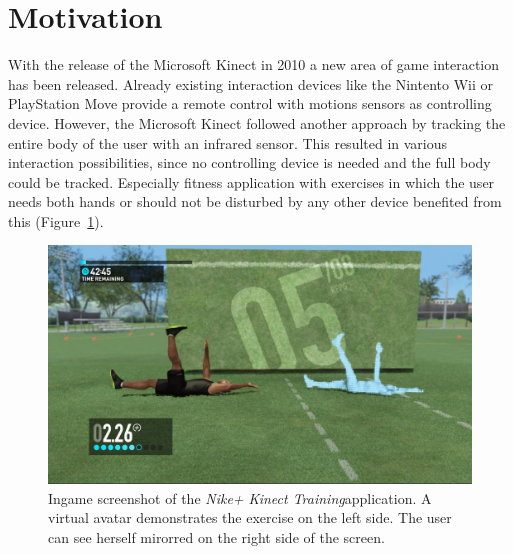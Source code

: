 \section{Motivation}
With the release of the Microsoft Kinect in 2010 a new area of game interaction has been released.
Already existing interaction devices like the Nintento Wii or PlayStation Move provide a remote control with motions sensors as controlling device.
However, the Microsoft Kinect followed another approach by tracking the entire body of the user with an infrared sensor.
This resulted in various interaction possibilities, since no controlling device is needed and the full body could be tracked.
Especially fitness application with exercises in which the user needs both hands or should not be disturbed by any other device benefited from this (Figure~\ref{fig:1_kinectSports}).
\begin{figure}[htb]
	\centering
	\begin{minipage}[t]{1\linewidth}
		\centering
		\includegraphics[width=0.55\linewidth]{Pictures/1_nikePlusKinect2}
		\caption{Ingame screenshot of the \textit{Nike+ Kinect Training}\protect\footnotemark application. A virtual avatar demonstrates the exercise on the left side. The user can see herself mirorred on the right side of the screen.}
		\label{fig:1_kinectSports}
	\end{minipage}
\end{figure}

